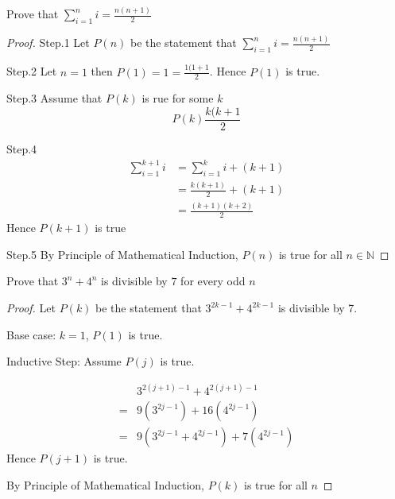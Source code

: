 \begin{exmp}
Prove that $\displaystyle\sum_{i=1}^ni=\frac{n(n+1)}{2}$
\end{exmp}
\begin{proof}

Step.1 Let $P(n)$ be the statement that $\displaystyle\sum_{i=1}^ni=\frac{n(n+1)}{2}$

Step.2 Let $n=1$ then $P(1) = 1 = \frac{1(1+1}{2}$. Hence $P(1)$ is true.

Step.3 Assume that $P(k)$ is rue for some $k$
$$P(k) \frac{k(k+1}{2}$$

Step.4 
\begin{align*}
    \sum_{i=1}^{k+1} i & = \sum_{i=1}^k i + (k+1) \\
    & = \frac{k(k+1)}{2}+(k+1)\\
    & = \frac{(k+1)(k+2)}{2}
\end{align*}
Hence $P(k+1)$ is true

Step.5 By Principle of Mathematical Induction, $P(n)$ is true for all $n\in \mathbb{N}$
\end{proof}

\begin{exmp}
Prove that $3^n+4^n$ is divisible by $7$ for every odd $n$
\end{exmp}

\begin{proof}
Let $P(k)$ be the statement that $3^{2k-1}+4^{2k-1}$ is divisible by 7.

Base case: $k=1$, $P(1)$ is true.

Inductive Step: Assume $P(j)$ is true.

\begin{align*}
    &3^{2(j+1)-1}+ 4^{2(j+1)-1}\\
    =& 9(3^{2j-1})+16(4^{2j-1})\\
    =& 9(3^{2j-1}+4^{2j-1}) + 7(4^{2j-1})
\end{align*}
Hence $P(j+1)$ is true.

By Principle of Mathematical Induction, $P(k)$ is true for all $n$

\end{proof}



